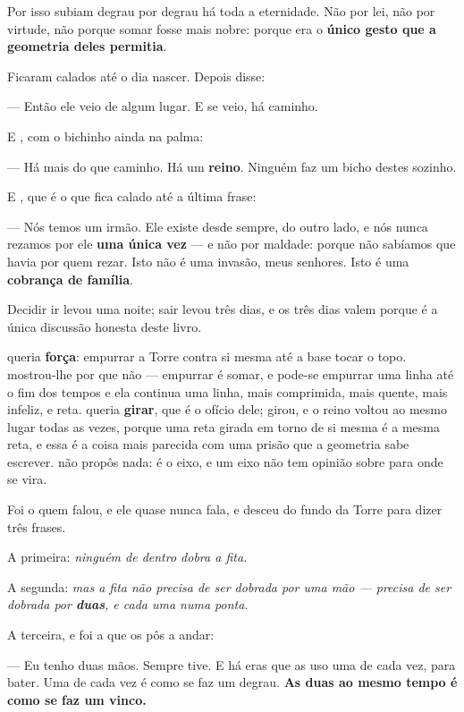 \documentclass[livro.tex]{subfiles}
\begin{document}
Por isso subiam degrau por degrau há toda a eternidade. Não por lei, não por virtude, não porque
somar fosse mais nobre: porque era o \textbf{único gesto que a geometria deles permitia}.

\medskip

Ficaram calados até o dia nascer. Depois \Yas disse:

--- Então ele veio de algum lugar. E se veio, há caminho.

E \Joa , com o bichinho ainda na palma:

--- Há mais do que caminho. Há um \textbf{reino}. Ninguém faz um bicho destes sozinho.

E \Drk , que é o que fica calado até a última frase:

--- Nós temos um irmão. Ele existe desde sempre, do outro lado, e nós nunca rezamos por ele
\textbf{uma única vez} --- e não por maldade: porque não sabíamos que havia por quem rezar. Isto
não é uma invasão, meus senhores. Isto é uma \textbf{cobrança de família}.

\medskip

Decidir ir levou uma noite; sair levou três dias, e os três dias valem porque é a única discussão
honesta deste livro.

\Yas queria \textbf{força}: empurrar a Torre contra si mesma até a base tocar o topo. \Ben
mostrou-lhe por que não --- empurrar é somar, e pode-se empurrar uma linha até o fim dos tempos e
ela continua uma linha, mais comprimida, mais quente, mais infeliz, e reta. \Joa queria
\textbf{girar}, que é o ofício dele; girou, e o reino voltou ao mesmo lugar todas as vezes,
porque uma reta girada em torno de si mesma é a mesma reta, e essa é a coisa mais parecida com uma
prisão que a geometria sabe escrever. \Lck não propôs nada: é o eixo, e um eixo não tem opinião
sobre para onde se vira.

Foi o \Opr quem falou, e ele quase nunca fala, e desceu do fundo da Torre para dizer três frases.

A primeira: \emph{ninguém de dentro dobra a fita.}

A segunda: \emph{mas a fita não precisa de ser dobrada por uma mão --- precisa de ser dobrada por
\textbf{duas}, e cada uma numa ponta.}

A terceira, e foi a que os pôs a andar:

--- Eu tenho duas mãos. Sempre tive. E há eras que as uso uma de cada vez, para bater. Uma de
cada vez é como se faz um degrau. \textbf{As duas ao mesmo tempo é como se faz um vinco.}
\end{document}
